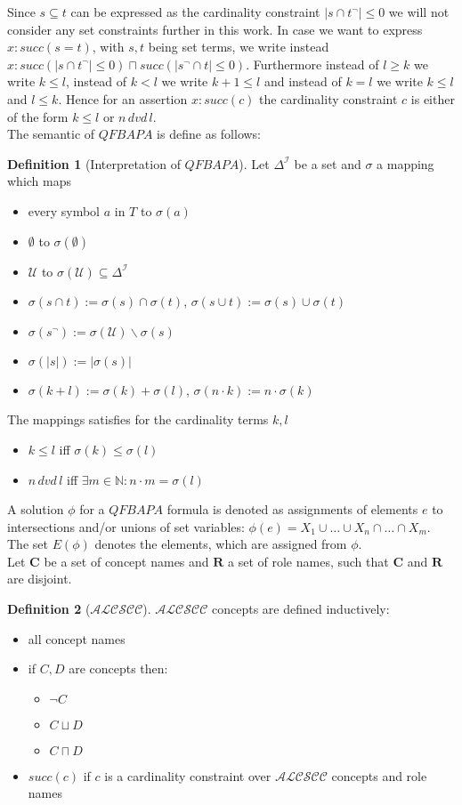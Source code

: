 \documentclass[a4paper,11pt]{scrartcl}
\theoremstyle{break}
\theoremstyle{definition}
\newtheorem{mydef}{Definition}
\begin{document}
Since $s\subseteq t$ can be expressed as the cardinality constraint $|s\cap t^\neg|\leq 0$ we will not consider any set constraints further in this work. In case we want to express $x:succ(s=t)$, with $s,t$ being set terms, we write instead $x:succ(|s\cap t^\neg|\leq 0)\sqcap succ(|s^\neg\cap t|\leq 0)$. Furthermore instead of $l\geq k$ we write $k\leq l$, instead of $k<l$ we write $k+1\leq l$ and instead of $k=l$ we write $k\leq l$ and $l\leq k$. Hence for an assertion $x:succ(c)$ the cardinality constraint $c$ is either of the form $k\leq l$ or $n\,dvd\,l$.\\
The semantic of $QFBAPA$ is define as follows:
\begin{mydef}[Interpretation of $QFBAPA$]
Let $\Delta^\mathcal{I}$ be a set and $\sigma$ a mapping which maps
\begin{itemize}
\item every symbol $a$ in $T$ to $\sigma(a)$
\item $\emptyset$ to $\sigma(\emptyset)$
\item $\mathcal{U}$ to $\sigma(\mathcal{U})\subseteq \Delta^\mathcal{I}$
\item $\sigma(s\cap t):= \sigma(s)\cap \sigma(t)$, $\sigma(s\cup t):= \sigma(s)\cup \sigma(t)$
\item $\sigma(s^\neg):=\sigma(\mathcal{U})\backslash \sigma(s)$
\item $\sigma(|s|):=|\sigma(s)|$
\item $\sigma(k+l):=\sigma(k)+\sigma(l)$, $\sigma(n\cdot k):= n\cdot \sigma(k)$
\end{itemize}
The mappings satisfies for the cardinality terms $k,l$
\begin{itemize}
\item $k\leq l$ iff $\sigma(k)\leq \sigma(l)$
\item $n\,dvd\,l$ iff $\exists m\in\mathbb{N}:n\cdot m = \sigma(l)$
\end{itemize}
\end{mydef}
A solution $\phi$ for a $QFBAPA$ formula is denoted as assignments of elements $e$ to intersections and/or unions of set variables: $\phi(e)=X_1\cup\dots\cup X_n\cap\dots\cap X_m$. The set $E(\phi)$ denotes the elements, which are assigned from $\phi$.\\
Let $\mathbf{C}$ be a set of concept names and $\mathbf{R}$ a set of role names, such that $\mathbf{C}$ and $\mathbf{R}$ are disjoint.
\begin{mydef}[$\mathcal{ALCSCC}$]
$\mathcal{ALCSCC}$ concepts are defined inductively:
\begin{itemize}
\item all concept names
\item if $C,D$ are concepts then:
\begin{itemize}
\item $\neg C$
\item $C\sqcup D$
\item $C\sqcap D$
\end{itemize}
\item $succ(c)$ if $c$ is a cardinality constraint over $\mathcal{ALCSCC}$ concepts and role names
\end{itemize}
\end{mydef}
\end{document}
